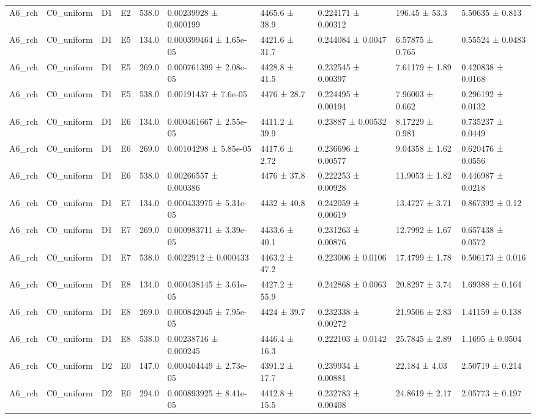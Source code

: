 \begin{table}
\begin{tabular}{llllllllll}
A6\_rch & C0\_uniform & D1 & E2 & 538.0 & 0.00239928 ± 0.000199 & 4465.6 ± 38.9 & 0.224171 ± 0.00312 & 196.45 ± 53.3 & 5.50635 ± 0.813 \\
A6\_rch & C0\_uniform & D1 & E5 & 134.0 & 0.000399464 ± 1.65e-05 & 4421.6 ± 31.7 & 0.244084 ± 0.0047 & 6.57875 ± 0.765 & 0.55524 ± 0.0483 \\
A6\_rch & C0\_uniform & D1 & E5 & 269.0 & 0.000761399 ± 2.08e-05 & 4428.8 ± 41.5 & 0.232545 ± 0.00397 & 7.61179 ± 1.89 & 0.420838 ± 0.0168 \\
A6\_rch & C0\_uniform & D1 & E5 & 538.0 & 0.00191437 ± 7.6e-05 & 4476 ± 28.7 & 0.224495 ± 0.00194 & 7.96003 ± 0.662 & 0.296192 ± 0.0132 \\
A6\_rch & C0\_uniform & D1 & E6 & 134.0 & 0.000461667 ± 2.55e-05 & 4411.2 ± 39.9 & 0.23887 ± 0.00532 & 8.17229 ± 0.981 & 0.735237 ± 0.0449 \\
A6\_rch & C0\_uniform & D1 & E6 & 269.0 & 0.00104298 ± 5.85e-05 & 4417.6 ± 2.72 & 0.236696 ± 0.00577 & 9.04358 ± 1.62 & 0.620476 ± 0.0556 \\
A6\_rch & C0\_uniform & D1 & E6 & 538.0 & 0.00266557 ± 0.000386 & 4476 ± 37.8 & 0.222253 ± 0.00928 & 11.9053 ± 1.82 & 0.446987 ± 0.0218 \\
A6\_rch & C0\_uniform & D1 & E7 & 134.0 & 0.000433975 ± 5.31e-05 & 4432 ± 40.8 & 0.242059 ± 0.00619 & 13.4727 ± 3.71 & 0.867392 ± 0.12 \\
A6\_rch & C0\_uniform & D1 & E7 & 269.0 & 0.000983711 ± 3.39e-05 & 4433.6 ± 40.1 & 0.231263 ± 0.00876 & 12.7992 ± 1.67 & 0.657438 ± 0.0572 \\
A6\_rch & C0\_uniform & D1 & E7 & 538.0 & 0.0022912 ± 0.000433 & 4463.2 ± 47.2 & 0.223006 ± 0.0106 & 17.4799 ± 1.78 & 0.506173 ± 0.016 \\
A6\_rch & C0\_uniform & D1 & E8 & 134.0 & 0.000438145 ± 3.61e-05 & 4427.2 ± 55.9 & 0.242868 ± 0.0063 & 20.8297 ± 3.74 & 1.69388 ± 0.164 \\
A6\_rch & C0\_uniform & D1 & E8 & 269.0 & 0.000842045 ± 7.95e-05 & 4424 ± 39.7 & 0.232338 ± 0.00272 & 21.9506 ± 2.83 & 1.41159 ± 0.138 \\
A6\_rch & C0\_uniform & D1 & E8 & 538.0 & 0.00238716 ± 0.000245 & 4446.4 ± 16.3 & 0.222103 ± 0.0142 & 25.7845 ± 2.89 & 1.1695 ± 0.0504 \\
A6\_rch & C0\_uniform & D2 & E0 & 147.0 & 0.000404449 ± 2.73e-05 & 4391.2 ± 17.7 & 0.239934 ± 0.00881 & 22.184 ± 4.03 & 2.50719 ± 0.214 \\
A6\_rch & C0\_uniform & D2 & E0 & 294.0 & 0.000893925 ± 8.41e-05 & 4412.8 ± 15.5 & 0.232783 ± 0.00408 & 24.8619 ± 2.17 & 2.05773 ± 0.197 \\

\end{tabular}
\end{table}
